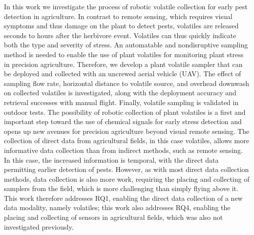 In this work we investigate the process of robotic volatile collection for early pest detection in agriculture. In contrast to remote sensing, which requires visual symptoms and thus damage on the plant to detect pests, volatiles are released seconds to hours after the herbivore event. Volatiles can thus quickly indicate both the type and severity of stress. An automatable and nondisruptive sampling method is needed to enable the use of plant volatiles for monitoring plant stress in precision agriculture. Therefore, we develop a plant volatile sampler that can be deployed and collected with an uncrewed aerial vehicle (UAV). The effect of sampling flow rate, horizontal distance to volatile source, and overhead downwash on collected volatiles is investigated, along with the deployment accuracy and retrieval successes with manual flight. Finally, volatile sampling is validated in outdoor tests. The possibility of robotic collection of plant volatiles is a first and important step toward the use of chemical signals for early stress detection and opens up new avenues for precision agriculture beyond visual remote sensing.
The collection of direct data from agricultural fields, in this case volatiles, allows more informative data collection than from indirect methods, such as remote sensing. In this case, the increased information is temporal, with the direct data permitting earlier detection of pests. However, as with most direct data collection methods, data collection is also more work, requiring the placing and collecting of samplers from the field, which is more challenging than simply flying above it. This work therefore addresses RQ1, enabling the direct data collection of a new data modality, namely volatiles; this work also addresses RQ4, enabling the placing and collecting of sensors in agricultural fields, which was also not investigated previously. 


